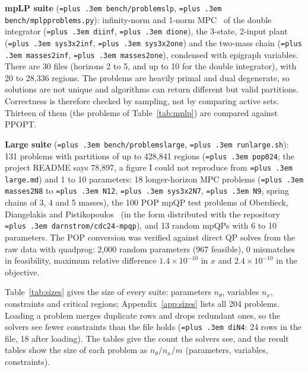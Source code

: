 \documentclass[10pt,a4paper]{article}
\newcommand{\ppopt}{PPOPT}
\newcommand{\code}[1]{{\let\_\bu\texttt{\spaceskip=\fontdimen2\font plus .3em #1}}}
\newcommand{\bu}{\textunderscore\hspace{0pt}}
\begin{document}
\textbf{mpLP suite} (\code{bench/problems\_lp}, \code{bench/mplp\_problems.py}): infinity-norm and 1-norm MPC~\cite{bemporad2002explicit} of
the double integrator (\code{diinf}, \code{dione}), the 3-state, 2-input plant (\code{sys3x2inf}, \code{sys3x2one}) and the two-mass chain
(\code{masses2inf}, \code{masses2one}), condensed with epigraph variables. There are 30 files (horizons 2 to 5, and up to 10 for the
double integrator), with 20 to 28,336 regions. The problems are heavily primal and dual degenerate, so solutions are not unique and
algorithms can return different but valid partitions. Correctness is therefore checked by sampling, not by comparing active sets.
Thirteen of them (the problems of Table~\ref{tab:mplp}) are compared against \ppopt{}.

\textbf{Large suite} (\code{bench/problems\_large}, \code{run\_large.sh}): 131 problems with partitions of up to 428,841 regions (\code{pop\_024}; the project README says 78,897, a figure I could not reproduce from \code{large.md}) and 1 to 10 parameters: 18
longer-horizon MPC problems (\code{masses2\_N8} to \code{N12}, \code{sys3x2\_N7}, \code{N9}, spring chains of 3, 4 and 5 masses), the 100 POP mpQP test
problems of Oberdieck, Diangelakis and Pistikopoulos~\cite{oberdieck2016pop} (in the form distributed with the repository
\code{darnstrom/cdc24-mpqp}), and 13 random mpQPs with 6 to 10 parameters. The POP conversion was verified against direct QP solves
from the raw data with quadprog: 2,000 random parameters (967 feasible), 0 mismatches in feasibility, maximum relative difference
$1.4\times10^{-10}$ in $x$ and $2.4\times10^{-10}$ in the objective.

Table~\ref{tab:sizes} gives the size of every suite: parameters $n_\theta$, variables $n_x$, constraints and critical regions; Appendix~\ref{app:sizes}
lists all 204 problems. Loading a problem merges duplicate rows and drops redundant ones, so the solvers see fewer constraints than the file holds
(\code{di\_N4}: 24 rows in the file, 18 after loading). The tables give the count the solvers see, and the result tables show the size of each
problem as $n_\theta/n_x/m$ (parameters, variables, constraints).

\begin{table}[!htbp]
\centering\small
\caption{Problem sizes by suite. Constraints are the rows of $Ax\le b+F\theta$ after loading; regions are from the archived solution of the fastest known solver for each problem (\code{bench/results/solution\_archive\_manifest\_1feb98b3ced6.csv}). For the degenerate mpLPs the partition is not unique, so another valid solver can report a different count.}
\label{tab:sizes}

\end{table}
\end{document}
